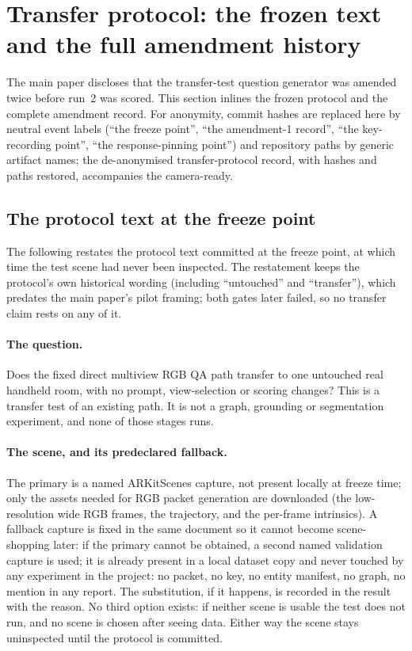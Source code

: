 \section{Transfer protocol: the frozen text and the full amendment history}
\label{ssec:transfer}

The main paper discloses that the transfer-test question generator was
amended twice before run~2 was scored. This section inlines the frozen
protocol and the complete amendment record. For anonymity, commit hashes are
replaced here by neutral event labels (``the freeze point'', ``the
amendment-1 record'', ``the key-recording point'', ``the response-pinning
point'') and repository paths by generic artifact names; the de-anonymised
transfer-protocol record, with hashes and paths restored, accompanies the
camera-ready.

\subsection{The protocol text at the freeze point}

The following restates the protocol text committed at the freeze point, at
which time the test scene had never been inspected. The restatement keeps
the protocol's own historical wording (including ``untouched'' and
``transfer''), which predates the main paper's pilot framing; both gates
later failed, so no transfer claim rests on any of it.

\paragraph{The question.} Does the fixed direct multiview RGB QA path
transfer to one untouched real handheld room, with no prompt, view-selection
or scoring changes? This is a transfer test of an existing path. It is not a
graph, grounding or segmentation experiment, and none of those stages runs.

\paragraph{The scene, and its predeclared fallback.} The primary is a named
ARKitScenes capture, not present locally at freeze time; only the assets
needed for RGB packet generation are downloaded (the low-resolution wide RGB
frames, the trajectory, and the per-frame intrinsics). A fallback capture is
fixed in the same document so it cannot become scene-shopping later: if the
primary cannot be obtained, a second named validation capture is used; it is
already present in a local dataset copy and never touched by any experiment
in the project: no packet, no key, no entity manifest, no graph, no mention
in any report. The substitution, if it happens, is recorded in the result
with the reason. No third option exists: if neither scene is usable the test
does not run, and no scene is chosen after seeing data. Either way the scene
stays uninspected until the protocol is committed.

